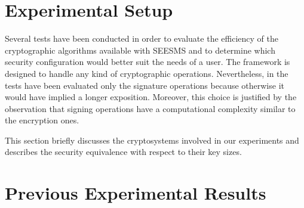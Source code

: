 \documentclass[authoryear]{elsarticle}
\begin{document}
%
%
%
%


\section{Experimental Setup}
\label{sec:exp}
Several tests have been conducted in order to evaluate the efficiency of the cryptographic algorithms available with SEESMS and to determine which security configuration would better suit the needs of a user. The framework is designed to handle any kind of cryptographic operations. Nevertheless, in the tests have been evaluated only the signature operations because otherwise it would have implied a longer exposition. Moreover, this choice is justified by the observation that signing operations have a computational complexity similar to the encryption ones.

This section briefly discusses the cryptosystems involved in our experiments and describes the security equivalence with respect to their key sizes.



\section{Previous Experimental Results}
\label{sec:experimental results}
\end{document}
